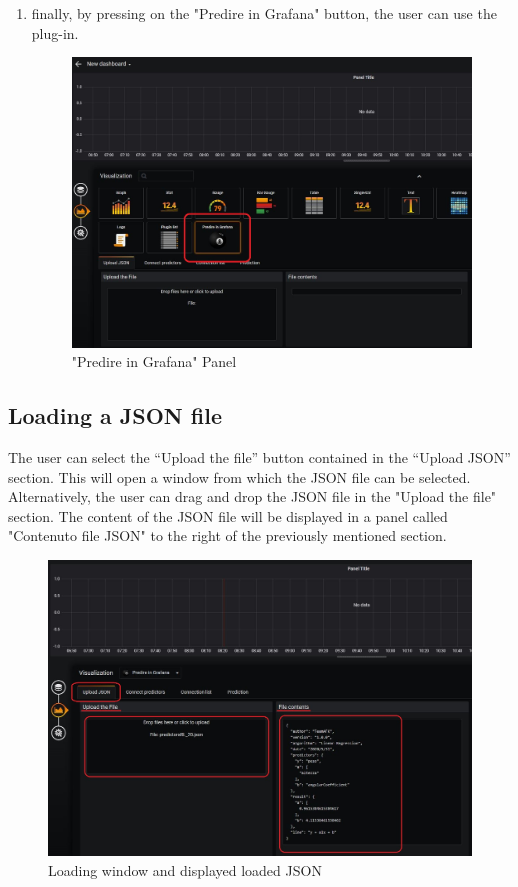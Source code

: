 \begin{enumerate}
	\item finally, by pressing on the "Predire in Grafana" button, the user can use the plug-in.
	
\begin{figure}[H]
\centering
\includegraphics[scale=0.55]{img/plug-in/plugin_1.JPG}
\caption{"Predire in Grafana" Panel}
\end{figure}

\end{enumerate}

	
\subsection{Loading a JSON file}
The user can select the “Upload the file” button contained in the “Upload JSON” section.
This will open a window from which the JSON file can be selected.
Alternatively, the user can drag and drop the JSON file in the "Upload the file" section.
The content of the JSON file will be displayed in a panel called "Contenuto file JSON" to the right of the previously mentioned section.

\begin{figure}[H]
\centering
\includegraphics[scale=0.60]{img/plug-in/plugin_2.JPG}
\caption{Loading window and displayed loaded JSON}
\end{figure}



